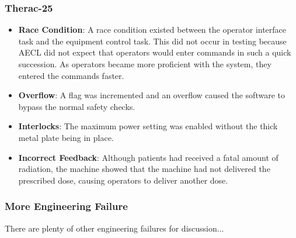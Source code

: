 \begin{frame}
\frametitle{Therac-25}

\begin{itemize}
	\item \textbf{Race Condition}: A race condition existed between the operator interface task and the equipment control task. This did not occur in testing because AECL did not expect that operators would enter commands in such a quick succession. As operators became more proficient with the system, they entered the commands faster.
	\item \textbf{Overflow}: A flag was incremented and an overflow caused the software to bypass the normal safety checks.
	\item \textbf{Interlocks}: The maximum power setting was enabled without the thick metal plate being in place.
	\item \textbf{Incorrect Feedback}: Although patients had received a fatal amount of radiation, the machine showed that the machine had not delivered the prescribed dose, causing operators to deliver another dose.
\end{itemize}

\end{frame}



\begin{frame}
\frametitle{More Engineering Failure}

There are plenty of other engineering failures for discussion...


\end{frame}




